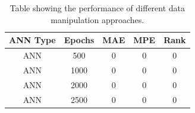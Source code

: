 \begin{table}[H]
\centering  %
\begin{tabular}{c c c c c} %
ANN Type & Epochs & MAE & MPE & Rank \\ [0.5ex] %
\hline                  %
ANN & 500 & 0 & 0 & 0 \\ %
ANN & 1000 & 0 & 0 & 0 \\
ANN & 2000 & 0 & 0 & 0 \\
ANN & 2500 & 0 & 0 & 0 \\ [1ex] %
\hline %
\end{tabular}
\caption{Table showing the performance of different data manipulation approaches.} %
\label{table:performanceOpti} %
\end{table} 
